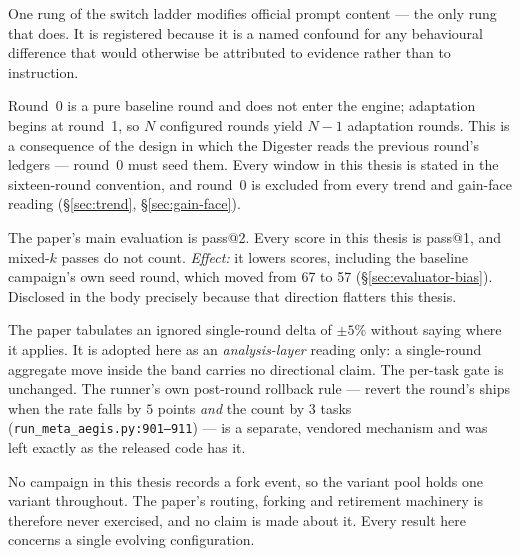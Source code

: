 \begin{description}[leftmargin=1.4em,style=nextline,itemsep=5pt]
  \item[\textnormal{\textbf{The registered L5 deviation.}}] One rung of the
        switch ladder modifies official prompt content --- the only rung
        that does. It is registered because it is a named confound for any
        behavioural difference that would otherwise be attributed to
        evidence rather than to instruction.

  \item[\textnormal{\textbf{Round indexing.}}] Round~0 is a pure baseline
        round and does not enter the engine; adaptation begins at round~1,
        so $N$ configured rounds yield $N-1$ adaptation rounds. This is a
        consequence of the design in which the Digester reads the previous
        round's ledgers --- round~0 must seed them. Every window in this
        thesis is stated in the sixteen-round convention, and round~0 is
        excluded from every trend and gain-face reading
        (\S\ref{sec:trend}, \S\ref{sec:gain-face}).

  \item[\textnormal{\textbf{pass@1 throughout.}}] The paper's main
        evaluation is pass@2. Every score in this thesis is pass@1, and
        mixed-$k$ passes do not count. \emph{Effect:} it lowers scores,
        including the baseline campaign's own seed round, which moved from
        67 to 57 (\S\ref{sec:evaluator-bias}). Disclosed in the body
        precisely because that direction flatters this thesis.

  \item[\textnormal{\textbf{The $\pm 5\%$ noise threshold.}}] The paper
        tabulates an ignored single-round delta of $\pm 5\%$ without saying
        where it applies. It is adopted here as an \emph{analysis-layer}
        reading only: a single-round aggregate move inside the band carries
        no directional claim. The per-task gate is unchanged. The runner's
        own post-round rollback rule --- revert the round's ships when the
        rate falls by $5$ points \emph{and} the count by $3$ tasks
        (\texttt{run\_meta\_aegis.py:901--911}) --- is a separate,
        vendored mechanism and was left exactly as the released code has
        it.

  \item[\textnormal{\textbf{Single lineage.}}] No campaign in this thesis
        records a fork event, so the variant pool holds one variant
        throughout. The paper's routing, forking and retirement machinery
        is therefore never exercised, and no claim is made about it. Every
        result here concerns a single evolving configuration.


\end{description}
